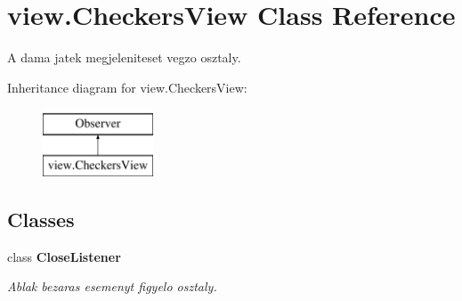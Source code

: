 \hypertarget{classview_1_1_checkers_view}{}\section{view.\+Checkers\+View Class Reference}
\label{classview_1_1_checkers_view}


A dama jatek megjeleniteset vegzo osztaly.  


Inheritance diagram for view.\+Checkers\+View\+:\begin{figure}[H]
\begin{center}
\leavevmode
\includegraphics[height=2.000000cm]{classview_1_1_checkers_view}
\end{center}
\end{figure}
\subsection*{Classes}
\begin{DoxyCompactItemize}
\item 
class {\bfseries Close\+Listener}
\begin{DoxyCompactList}\small\item\em Ablak bezaras esemenyt figyelo osztaly. \end{DoxyCompactList}\end{DoxyCompactItemize}
